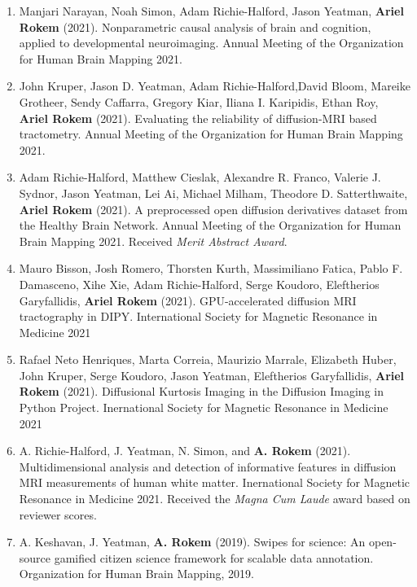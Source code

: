 \documentclass[11pt,fullpage]{article}
\begin{document}
\begin{enumerate}
\item Manjari Narayan, Noah Simon, Adam Richie-Halford, Jason Yeatman, {\bf Ariel Rokem} (2021). Nonparametric causal analysis of brain and cognition, applied to developmental neuroimaging. Annual Meeting of the Organization for Human Brain Mapping 2021.

\item John Kruper, Jason D. Yeatman, Adam Richie-Halford,David Bloom, Mareike Grotheer, Sendy Caffarra, Gregory Kiar, Iliana I. Karipidis, Ethan Roy, {\bf Ariel Rokem} (2021). Evaluating the reliability of diffusion-MRI based tractometry. Annual Meeting of the Organization for Human Brain Mapping 2021.

\item Adam Richie-Halford, Matthew Cieslak, Alexandre R. Franco, Valerie J. Sydnor, Jason Yeatman, Lei Ai, Michael Milham, Theodore D. Satterthwaite, {\bf Ariel Rokem} (2021). A preprocessed open diffusion derivatives dataset from the Healthy Brain Network. Annual Meeting of the Organization for Human Brain Mapping 2021. Received \emph{Merit Abstract Award}.

\item Mauro Bisson, Josh Romero, Thorsten Kurth, Massimiliano Fatica, Pablo F. Damasceno, Xihe Xie, Adam Richie-Halford, Serge Koudoro, Eleftherios Garyfallidis, {\bf Ariel Rokem} (2021). GPU-accelerated diffusion MRI tractography in DIPY. International Society for Magnetic Resonance in Medicine 2021

\item Rafael Neto Henriques, Marta Correia, Maurizio Marrale, Elizabeth Huber, John Kruper, Serge Koudoro, Jason Yeatman, Eleftherios Garyfallidis, {\bf Ariel Rokem} (2021). Diffusional Kurtosis Imaging in the Diffusion Imaging in Python Project. Inernational Society for Magnetic Resonance in Medicine 2021

\item A. Richie-Halford, J. Yeatman, N. Simon, and {\bf A. Rokem} (2021). Multidimensional analysis and detection of informative features in diffusion MRI measurements of human white matter. Inernational Society for Magnetic Resonance in Medicine 2021. Received the \emph{Magna Cum Laude} award based on reviewer scores.

\item A. Keshavan, J. Yeatman, {\bf A. Rokem} (2019). Swipes for science: An
open-source gamified citizen science framework for scalable data annotation.
Organization for Human Brain Mapping, 2019.


\end{enumerate}
\end{document}
